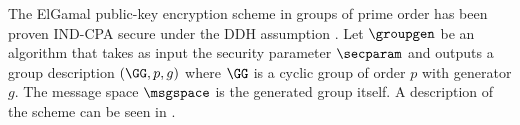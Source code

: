 The ElGamal public-key encryption scheme \cite{C:ElGamal84} in groups of prime order has been proven IND-CPA secure under the DDH assumption \cite{ElGamalSec,C:CraSho98,NaoRei04}.
Let $\groupgen$ be an algorithm that takes as input the security parameter $\secparam$ and outputs a group description $(\GG, p, g)$ where $\GG$ is a cyclic group of order $p$ with generator $g$.
The message space $\msgspace$ is the generated group itself.
A description of the scheme can be seen in .
%
%
